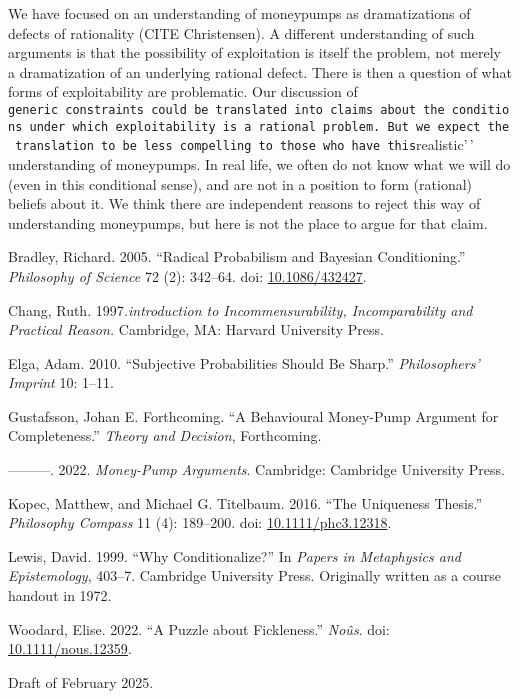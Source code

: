 \documentclass[
  11pt,
  letterpaper,
  DIV=11,
  numbers=noendperiod,
  twoside]{scrartcl}
\newlength{\cslhangindent}
\newenvironment{CSLReferences}[2] %
 {\begin{list}{}{%
  \setlength{\itemindent}{0pt}
  \setlength{\leftmargin}{0pt}
  \setlength{\parsep}{0pt}
  \ifodd #1
   \setlength{\leftmargin}{\cslhangindent}
   \setlength{\itemindent}{-1\cslhangindent}
  \fi
  \setlength{\itemsep}{#2\baselineskip}}}
 {\end{list}}
\begin{document}
We have focused on an understanding of moneypumps as dramatizations of
defects of rationality (CITE Christensen). A different understanding of
such arguments is that the possibility of exploitation is itself the
problem, not merely a dramatization of an underlying rational defect.
There is then a question of what forms of exploitability are
problematic. Our discussion of
\texttt{generic\ constraints\textquotesingle{}\textquotesingle{}\ could\ be\ translated\ into\ claims\ about\ the\ conditions\ under\ which\ exploitability\ is\ a\ rational\ problem.\ But\ we\ expect\ the\ translation\ to\ be\ less\ compelling\ to\ those\ who\ have\ this}realistic'\,'
understanding of moneypumps. In real life, we often do not know what we
will do (even in this conditional sense), and are not in a position to
form (rational) beliefs about it. We think there are independent reasons
to reject this way of understanding moneypumps, but here is not the
place to argue for that claim.

\label{refs}
\begin{CSLReferences}{1}{0}
Bradley, Richard. 2005. {``Radical Probabilism and Bayesian
Conditioning.''} \emph{Philosophy of Science} 72 (2): 342--64. doi:
\href{https://doi.org/10.1086/432427}{10.1086/432427}.

Chang, Ruth. 1997\emph{.introduction to Incommensurability,
Incomparability and Practical Reason.} Cambridge, MA: Harvard University
Press.

Elga, Adam. 2010. {``Subjective Probabilities Should Be Sharp.''}
\emph{Philosophers' Imprint} 10: 1--11.

Gustafsson, Johan E. Forthcoming. {``A Behavioural Money-Pump Argument
for Completeness.''} \emph{Theory and Decision}, Forthcoming.

---------. 2022. \emph{Money-Pump Arguments}. Cambridge: Cambridge
University Press.

Kopec, Matthew, and Michael G. Titelbaum. 2016. {``The Uniqueness
Thesis.''} \emph{Philosophy Compass} 11 (4): 189--200. doi:
\href{https://doi.org/10.1111/phc3.12318}{10.1111/phc3.12318}.

Lewis, David. 1999. {``Why Conditionalize?''} In \emph{Papers in
Metaphysics and Epistemology}, 403--7. Cambridge University Press.
Originally written as a course handout in 1972.

Woodard, Elise. 2022. {``A Puzzle about Fickleness.''} \emph{No{û}s}.
doi: \href{https://doi.org/10.1111/nous.12359}{10.1111/nous.12359}.

\end{CSLReferences}



\noindent Draft of February 2025.
\end{document}
